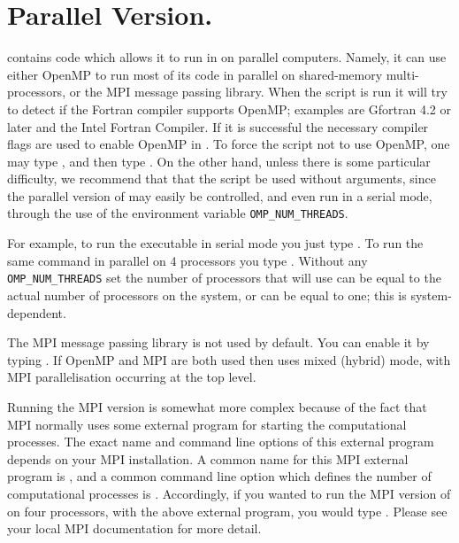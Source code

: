 \documentclass[12pt]{report}
\begin{document}
\section{ Parallel Version.} \label{sec:Parallel}
\AUTO contains code which allows
it to run in on parallel computers.  Namely,
it can use either OpenMP to run most of its code in parallel
on shared-memory multi-processors, or the MPI message passing
library.
When the  script is run it will try to
detect if the Fortran compiler supports OpenMP; examples
are Gfortran 4.2 or later and the Intel Fortran Compiler.
If it is successful the necessary compiler flags are used
to enable OpenMP in \AUTO.
To force the  script not to use OpenMP,
one may type ,
and then type .
On the other hand, unless there is some
particular difficulty, we recommend that that the 
 script be used without arguments, since the
parallel version of \AUTO may easily be controlled,
and even run in a serial mode,  
through the use of the environment variable {\tt OMP\_NUM\_THREADS}.

For example, to run the \AUTO executable 
in serial mode you just type .
To run the same command in parallel on 4 processors you type 
. Without any {\tt OMP\_NUM\_THREADS}
set the number of processors that \AUTO will use can be equal to the
actual number of processors on the system, or can be equal to one;
this is system-dependent.

The MPI message passing library is not used by default. You can enable it
by typing  . If OpenMP and MPI are
both used then \AUTO uses mixed (hybrid) mode, with MPI parallelisation
occurring at the top level.

Running the MPI version is somewhat more complex because of the fact
that MPI normally uses some external program for starting the
computational processes.  The exact name and command line options of
this external program depends on your MPI installation.  A common name
for this MPI external program is , and a common command
line option which defines the number of computational processes is .  Accordingly, if you wanted to run the MPI version of \AUTO
on four processors, with the above external program, you would
type .  Please see your local MPI
documentation for more detail.
\end{document}
